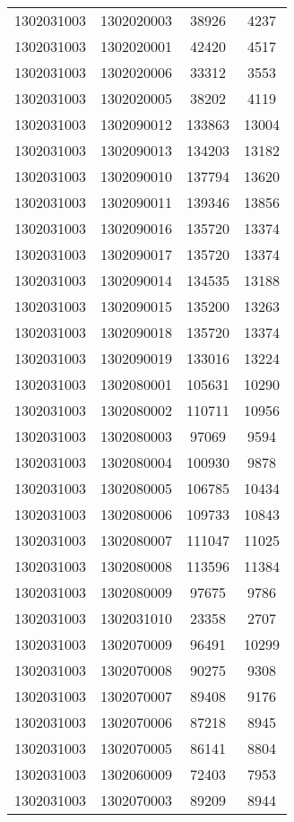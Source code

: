 \begin{longtable}[h]{llcc}
		1302031003 & 1302020003 & 38926 & 4237\\
		1302031003 & 1302020001 & 42420 & 4517\\
		1302031003 & 1302020006 & 33312 & 3553\\
		1302031003 & 1302020005 & 38202 & 4119\\
		1302031003 & 1302090012 & 133863 & 13004\\
		1302031003 & 1302090013 & 134203 & 13182\\
		1302031003 & 1302090010 & 137794 & 13620\\
		1302031003 & 1302090011 & 139346 & 13856\\
		1302031003 & 1302090016 & 135720 & 13374\\
		1302031003 & 1302090017 & 135720 & 13374\\
		1302031003 & 1302090014 & 134535 & 13188\\
		1302031003 & 1302090015 & 135200 & 13263\\
		1302031003 & 1302090018 & 135720 & 13374\\
		1302031003 & 1302090019 & 133016 & 13224\\
		1302031003 & 1302080001 & 105631 & 10290\\
		1302031003 & 1302080002 & 110711 & 10956\\
		1302031003 & 1302080003 & 97069 & 9594\\
		1302031003 & 1302080004 & 100930 & 9878\\
		1302031003 & 1302080005 & 106785 & 10434\\
		1302031003 & 1302080006 & 109733 & 10843\\
		1302031003 & 1302080007 & 111047 & 11025\\
		1302031003 & 1302080008 & 113596 & 11384\\
		1302031003 & 1302080009 & 97675 & 9786\\
		1302031003 & 1302031010 & 23358 & 2707\\
		1302031003 & 1302070009 & 96491 & 10299\\
		1302031003 & 1302070008 & 90275 & 9308\\
		1302031003 & 1302070007 & 89408 & 9176\\
		1302031003 & 1302070006 & 87218 & 8945\\
		1302031003 & 1302070005 & 86141 & 8804\\
		1302031003 & 1302060009 & 72403 & 7953\\
		1302031003 & 1302070003 & 89209 & 8944\\

\end{longtable}
